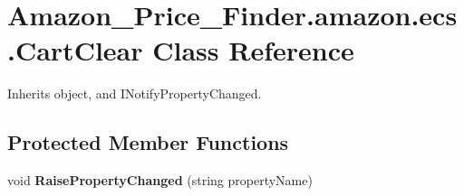 \hypertarget{class_amazon___price___finder_1_1amazon_1_1ecs_1_1_cart_clear}{\section{Amazon\-\_\-\-Price\-\_\-\-Finder.\-amazon.\-ecs.\-Cart\-Clear Class Reference}
\label{class_amazon___price___finder_1_1amazon_1_1ecs_1_1_cart_clear}
}


 




Inherits object, and I\-Notify\-Property\-Changed.

\subsection*{Protected Member Functions}
\begin{DoxyCompactItemize}
\item 
\hypertarget{class_amazon___price___finder_1_1amazon_1_1ecs_1_1_cart_clear_aa6614257e93684b0086cf6b9b475b791}{void {\bfseries Raise\-Property\-Changed} (string property\-Name)}\label{class_amazon___price___finder_1_1amazon_1_1ecs_1_1_cart_clear_aa6614257e93684b0086cf6b9b475b791}

\end{DoxyCompactItemize}
